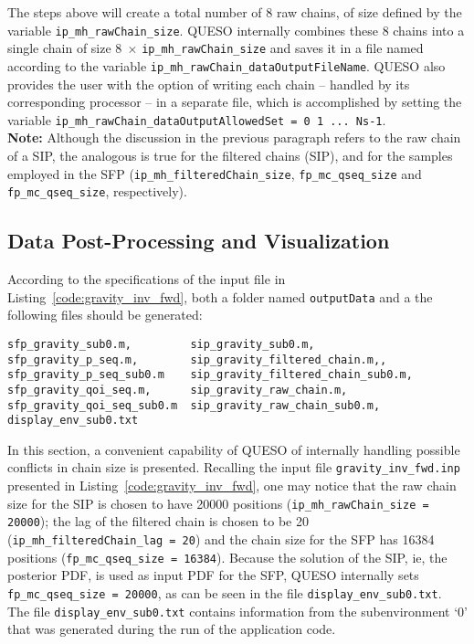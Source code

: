 The steps above will create a total number of 8 raw chains, of size defined by the variable \texttt{ip\_mh\_rawChain\_size}. QUESO internally combines these 8 chains into a single chain of size $8\; \times\,$\texttt{ip\_mh\_rawChain\_size} and saves it in a file named according to the variable \texttt{ip\_mh\_rawChain\_dataOutputFileName}. 
QUESO also provides the user with the option of writing each chain -- handled by its corresponding processor -- in a separate file, which is accomplished by setting the variable \texttt{ip\_mh\_rawChain\_dataOutputAllowedSet = 0 1 ... Ns-1}.\\

\noindent
{\bf Note:} Although the discussion in the previous paragraph refers to the raw chain of a SIP, the analogous is true for the filtered chains (SIP), and for the samples employed in the SFP (\texttt{ip\_mh\_filteredChain\_size},    \texttt{fp\_mc\_qseq\_size} and \texttt{fp\_mc\_qseq\_size}, respectively). 




\subsection{Data Post-Processing and Visualization}\label{sec:gravity-results}

 

According to the specifications of the input file in Listing~\ref{code:gravity_inv_fwd}, 
both a folder named \verb+outputData+ and a the following files should be generated:
\begin{verbatim}
sfp_gravity_sub0.m,         sip_gravity_sub0.m, 
sfp_gravity_p_seq.m,        sip_gravity_filtered_chain.m,,
sfp_gravity_p_seq_sub0.m    sip_gravity_filtered_chain_sub0.m,
sfp_gravity_qoi_seq.m,      sip_gravity_raw_chain.m,       
sfp_gravity_qoi_seq_sub0.m  sip_gravity_raw_chain_sub0.m,
display_env_sub0.txt 
\end{verbatim}

In this section, a convenient capability of QUESO of internally handling possible conflicts in 
chain size is presented. Recalling the input file \verb+gravity_inv_fwd.inp+ presented in 
Listing~\ref{code:gravity_inv_fwd}, one may notice that  the raw chain size for the SIP is 
chosen to have 20000 positions (\verb+ip_mh_rawChain_size = 20000+); the lag of the filtered chain 
is chosen to be 20 (\verb+ip_mh_filteredChain_lag = 20+) and the chain size for the SFP has 16384 
positions (\verb+fp_mc_qseq_size = 16384+). Because the solution of the SIP, ie, the posterior PDF, 
is used as input PDF for the SFP, QUESO internally sets \verb+fp_mc_qseq_size = 20000+, as can be 
seen in the file \verb+display_env_sub0.txt+.  The file \verb+display_env_sub0.txt+ contains information 
from the subenvironment `0' that was generated during the run of the application code.

